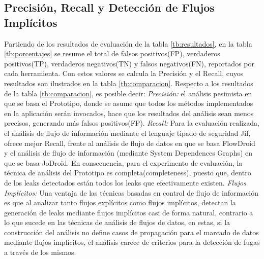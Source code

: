 \subsection{Precisión, Recall y Detección de Flujos Implícitos}
Partiendo de los resultados de evaluación de la tabla \ref{tb:resultados}, 
en la tabla \ref{tb:porcentajes} se resume el total de falsos positivos(FP),
verdaderos positivos(TP), verdaderos negativos(TN) y falsos negativos(FN),
reportados por cada herramienta. Con estos valores se calcula la Precisión y el
Recall, cuyos resultados son ilustrados en la tabla
\ref{tb:comparacion}.\newline 
Respecto a los resultados de la tabla \ref{tb:comparacion}, es posible decir: 
\emph{Precisión:} el análisis pesimista en que se basa el Prototipo, donde se
asume que todos los métodos implementados en la aplicación serán invocados, hace que los resultados
del análisis sean menos precisos, generando más falsos positivos(FP).\newline 
\emph{Recall:} Para la evaluación realizada, el análisis de flujo de información
mediante el lenguaje tipado de seguridad Jif, ofrece mejor Recall, frente al análisis
de flujo de datos en que se basa FlowDroid y el análisis de flujo de información
(mediante System Dependences Graphs) en que se basa JoDroid. En consecuencia,
para el experimento de evaluación, la técnica de análisis del Prototipo es
completa(completeness), puesto que, dentro de los leaks detectados están todos
los leaks que efectivamente existen.\newline 
\emph{Flujos Implícitos:} Una ventaja de las técnicas basadas en control de
flujo de información es que al analizar tanto flujos explícitos como flujos implícitos,
detectan la generación de leaks mediante flujos implícitos casi de forma
natural, contrario a lo que sucede en las técnicas de análisis de flujos de
datos, en estas, si la construcción del análisis no define casos de propagación
para el marcado de datos mediante flujos implícitos, el análisis carece de
criterios para la detección de fugas a través de los mismos.\newline
